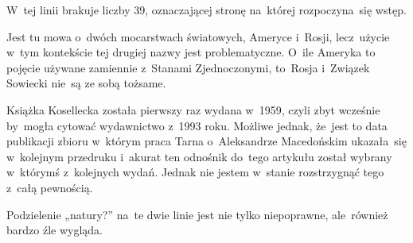 \documentclass[a4paper,11pt]{article}
\begin{document}

\vspace{0em}


\noindent
{} W~tej linii brakuje liczby 39, oznaczającej stronę
na~której rozpoczyna~się wstęp.

\vspace{\spaceFour}





\noindent
{} Jest tu mowa o~dwóch mocarstwach światowych, Ameryce
i~Rosji, lecz~użycie w~tym kontekście tej drugiej nazwy jest
problematyczne. O~ile Ameryka to pojęcie używane zamiennie z~Stanami
Zjednoczonymi, to~Rosja i~Związek Sowiecki nie~są ze sobą tożsame.

\vspace{\spaceFour}





\noindent
{} Książka Kosellecka została pierwszy raz wydana
w~1959, czyli zbyt wcześnie by~mogła cytować wydawnictwo z~1993 roku.
Możliwe jednak, że~jest to data publikacji zbioru w~którym praca Tarna
o~Aleksandrze Macedońskim ukazała~się w~kolejnym przedruku i~akurat
ten odnośnik do~tego artykułu został wybrany w~którymś z~kolejnych
wydań. Jednak nie jestem w~stanie rozstrzygnąć tego z~całą pewnością.

\vspace{\spaceFour}





\noindent
{} Podzielenie „natury?” na~te dwie linie jest nie tylko
niepoprawne, ale~również bardzo źle wygląda.

\vspace{\spaceFour}





\end{document}
